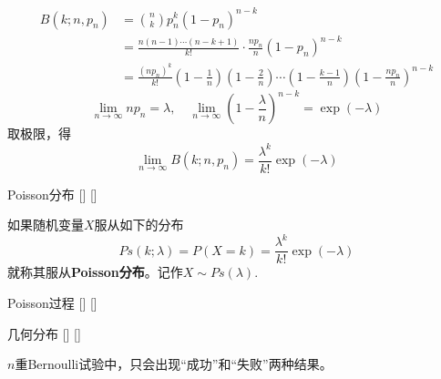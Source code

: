 \documentclass[UTF8]{ctexart}
\begin{document}
        \begin{prf}
            
            
            
            
            \[
                \begin{aligned}
                    B(k;n,p_n) &= \binom{n}{k}p_n^k(1-p_n)^{n-k}\\
                    &=\frac{n(n-1)\cdots(n-k+1)}{k!}\cdot\frac{np_n}{n}\left(1-p_n \right)^{n-k}\\
                    &=\frac{(np_n)^k}{k!}\left(1-\frac{1}{n} \right)\left(1-\frac{2}{n} \right)\cdots\left(1-\frac{k-1}{n} \right)\left(1-\frac{np_n}{n} \right)^{n-k}        
                \end{aligned}
            \]
            \[\lim_{n\to\infty}np_n=\lambda,\quad\lim_{n\to\infty}\left(1-\frac{\lambda}{n} \right)^{n-k}=\exp(-\lambda) \]
            取极限，得\[\lim_{n\to\infty} B(k;n,p_n)=\frac{\lambda^k}{k!}\exp (-\lambda) \]
        \end{prf}

        \begin{dfn}
            []
            {Poisson分布}
            []
            []


            如果随机变量$X$服从如下的分布\[Ps(k;\lambda)=P(X=k)=\frac{\lambda^k}{k!}\exp (-\lambda)\]就称其服从\textbf{Poisson分布}。记作$X\sim Ps(\lambda)$.
        \end{dfn}

        \begin{dfn}
            []
            {Poisson过程}
            []
            []

        \end{dfn}

        \begin{dfn}
            []
            {几何分布}
            []
            []


            $n$重Bernoulli试验中，只会出现“成功”和“失败”两种结果。
        \end{dfn}
\end{document}

